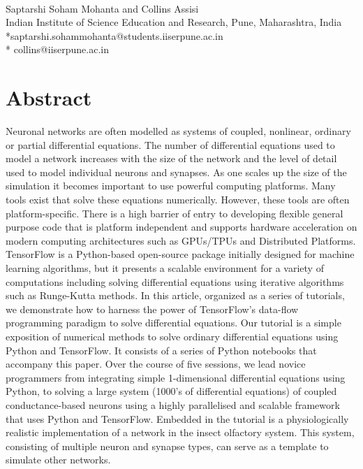 \documentclass[10pt,letterpaper]{article}
\begin{document}
\vspace*{0.2in}

\begin{flushleft}
{\Large
\textbf{} %
}\\
Saptarshi Soham Mohanta and Collins Assisi
\bigskip
\\
Indian Institute of Science Education and Research, Pune, Maharashtra, India\\
\bigskip
*saptarshi.sohammohanta@students.iiserpune.ac.in \\
* collins@iiserpune.ac.in

\end{flushleft}
\section*{Abstract}
Neuronal networks are often modelled as systems of coupled, nonlinear, ordinary or
partial differential equations. The number of differential equations used to model a
network increases with the size of the network and the level of detail used to model
individual neurons and synapses. As one scales up the size of the simulation it becomes important to use powerful computing platforms. Many tools exist that solve these equations numerically. However, these tools are often platform-specific. There is a high barrier of entry to developing flexible general purpose code that is platform independent and supports hardware acceleration on modern computing architectures such as GPUs/TPUs and Distributed Platforms. TensorFlow is a Python-based open-source package initially designed for machine learning algorithms, but it presents a scalable environment for a variety of computations including solving differential equations using iterative algorithms such as Runge-Kutta methods. In this article, organized as a series of tutorials, we demonstrate how to harness the power of TensorFlow’s data-flow programming paradigm to solve differential equations. Our tutorial is a simple exposition of numerical methods to solve ordinary differential equations using Python and TensorFlow. It consists of a series of Python notebooks that accompany this paper. Over the course of five sessions, we lead novice programmers from integrating simple 1-dimensional differential equations using Python, to solving a large system (1000’s of differential equations) of coupled conductance-based neurons using a highly parallelised and scalable framework that uses Python and TensorFlow. Embedded in the tutorial is a physiologically realistic implementation of a network in the insect olfactory system. This system, consisting of multiple neuron and synapse types, can serve as a template to simulate other networks.
\end{document}
